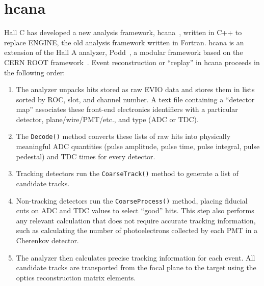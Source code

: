 \section{hcana}
Hall C has developed a new analysis framework,
hcana~\cite{hcana_github}, written in C++ to replace ENGINE, the old
analysis framework written in Fortran.
hcana is an extension of the Hall A analyzer, Podd~\cite{podd_github},
a modular framework based on the CERN ROOT framework~\cite{cern_root}.
Event reconstruction or ``replay'' in hcana proceeds in the following order:

\begin{enumerate}

    \item The analyzer unpacks hits stored as raw EVIO data and stores them in
        lists sorted by ROC, slot, and channel number.
        A text file containing a ``detector map'' associates these front-end
        electronics identifiers with a particular detector,
        plane/wire/PMT/etc., and type (ADC or TDC).

    \item The \texttt{Decode()} method converts these lists of raw hits into
        physically meaningful ADC quantities (pulse amplitude, pulse time,
        pulse integral, pulse pedestal) and TDC times for every detector.

    \item Tracking detectors run the \texttt{CoarseTrack()} method to generate
        a list of candidate tracks.

    \item Non-tracking detectors run the \texttt{CoarseProcess()} method,
        placing fiducial cuts on ADC and TDC values to select ``good'' hits.
        This step also performs any relevant calculation that does not require
        accurate tracking information, such as calculating the number of
        photoelectrons collected by each PMT in a Cherenkov detector.

    \item The analyzer then calculates precise tracking information for each
        event.
        All candidate tracks are transported from the focal plane to the target
        using the optics reconstruction matrix elements.


\end{enumerate}
